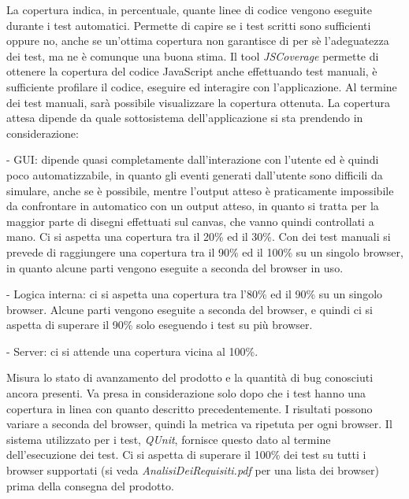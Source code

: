 La copertura indica, in percentuale, quante linee di codice vengono eseguite durante i test automatici. Permette di capire se i test scritti sono sufficienti oppure no, anche se un'ottima copertura non garantisce di per s\`e l'adeguatezza dei test, ma ne \`e comunque una buona stima. Il tool \textit{JSCoverage} permette di ottenere la copertura del codice JavaScript anche effettuando test manuali, \`e sufficiente profilare il codice, eseguire ed interagire con l'applicazione. Al termine dei test manuali, sar\`a possibile visualizzare la copertura ottenuta. La copertura attesa dipende da quale sottosistema dell'applicazione si sta prendendo in considerazione:
\begin{elencopuntato}[\subsecindent]
\item[-] GUI: dipende quasi completamente dall'interazione con l'utente ed \`e quindi poco automatizzabile, in quanto gli eventi generati dall'utente sono difficili da simulare, anche se \`e possibile, mentre l'output atteso \`e praticamente impossibile da confrontare in automatico con un output atteso, in quanto si tratta per la maggior parte di disegni effettuati sul canvas, che vanno quindi controllati a mano. Ci si aspetta una copertura tra il 20\% ed il 30\%. Con dei test manuali si prevede di raggiungere una copertura tra il 90\% ed il 100\% su un singolo browser, in quanto alcune parti vengono eseguite a seconda del browser in uso.
\item[-] Logica interna: ci si aspetta una copertura tra l'80\% ed il 90\% su un singolo browser. Alcune parti vengono eseguite a seconda del browser, e quindi ci si aspetta di superare il 90\% solo eseguendo i test su pi\`u browser.
\item[-] Server: ci si attende una copertura vicina al 100\%.
\end{elencopuntato}

Misura lo stato di avanzamento del prodotto e la quantit\`a di bug conosciuti ancora presenti. Va presa in considerazione solo dopo che i test hanno una copertura in linea con quanto descritto precedentemente. I risultati possono variare a seconda del browser, quindi la metrica va ripetuta per ogni browser. Il sistema utilizzato per i test, \textit{QUnit}, fornisce questo dato al termine dell'esecuzione dei test. Ci si aspetta di superare il 100\% dei test su tutti i browser supportati (si veda \textit{AnalisiDeiRequisiti.pdf} per una lista dei browser) prima della consegna del prodotto.

